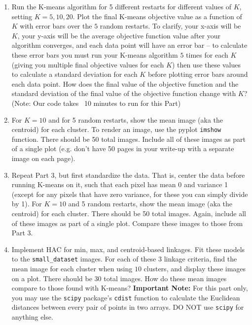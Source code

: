 \documentclass[submit]{harvardml}
\begin{document}
\begin{problem}
\begin{enumerate}
\item Run the K-means algorithm for 5 different restarts for different
  values of $K$, setting $K = 5, 10, 20$. Plot the final K-means objective value as a function
  of $K$ with error bars over the $5$ random restarts. To clarify, your
  x-axis will be $K$, your y-axis will be the average objective function value
  after your algorithm converges, and each data point will have an
  error bar -- to calculate these error bars you must run your K-means
  algorithm $5$ times for each $K$ (giving you multiple final objective values
  for each $K$) then use these values to calculate a standard deviation for
  each $K$ before plotting error bars around each data point. How
  does the final value of the objective function and the standard deviation of the final
  value of the objective function change with $K$? (Note: Our code takes ~10 minutes to run for this Part)
  
\item For $K=10$ and for 5 random restarts, show the mean
  image (aka the centroid) for each cluster.
  To render an image, use the pyplot
  \texttt{imshow} function. There should be 50 total images. Include all of these images
  as part of a single plot (e.g. don't have 50 pages in your write-up with a
  separate image on each page).

\item Repeat Part 3, but first standardize the data. That is, center
  the data before running K-means on it, such that each pixel has mean 0 and variance 1 (except
  for any pixels that have zero variance, for these you can simply
  divide by 1). For $K=10$ and 5 random restarts, show the mean image
  (aka the centroid) for each cluster. There should be 50 total
  images. Again, include all of these images as part of a single plot.
  Compare these images to those from Part 3.

\item Implement HAC for min, max, and centroid-based linkages. Fit these models to the \texttt{small\_dataset} images. 
  For each of these 3 linkage criteria, find the mean image for each cluster when using $10$ clusters, and display these images on a plot. There should be 30 total images.
  How do these mean images compare to those found with K-means? \textbf{Important Note:} For this part only, you may use the \texttt{scipy} package's \texttt{cdist} function to calculate the Euclidean distances between every pair of points in two arrays. DO NOT use \texttt{scipy} for anything else. 


\end{enumerate}
\end{problem}
\end{document}
